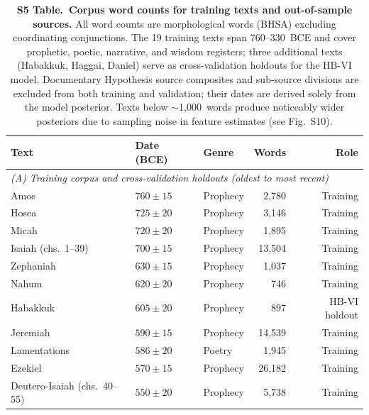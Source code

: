 \documentclass[10pt,letterpaper]{article}
\begin{document}
\begin{table}[!ht]
\caption{\textbf{S5 Table.\ Corpus word counts for training texts and out-of-sample sources.}
All word counts are morphological words (BHSA) excluding coordinating conjunctions.
The 19 training texts span 760--330~BCE and cover prophetic, poetic, narrative, and
wisdom registers; three additional texts (Habakkuk, Haggai, Daniel) serve as
cross-validation holdouts for the HB-VI model.  Documentary Hypothesis source composites
and sub-source divisions are excluded from both training and validation; their dates are
derived solely from the model posterior.  Texts below $\sim$1{,}000~words produce
noticeably wider posteriors due to sampling noise in feature estimates (see Fig.~S10).}
\label{tab:s5_corpus}
\begin{tabular}{lllrr}
\hline
\textbf{Text} & \textbf{Date (BCE)} & \textbf{Genre} & \textbf{Words} & \textbf{Role} \\
\hline
\multicolumn{5}{l}{\textit{(A) Training corpus and cross-validation holdouts (oldest to most recent)}} \\
  Amos                                   & $760\pm15$       & Prophecy     &   2,780 & Training \\
  Hosea                                  & $725\pm20$       & Prophecy     &   3,146 & Training \\
  Micah                                  & $720\pm20$       & Prophecy     &   1,895 & Training \\
  Isaiah (chs.\ 1--39)                   & $700\pm15$       & Prophecy     &  13,504 & Training \\
  Zephaniah                              & $630\pm15$       & Prophecy     &   1,037 & Training \\
  Nahum                                  & $620\pm20$       & Prophecy     &     746 & Training \\
  Habakkuk                               & $605\pm20$       & Prophecy     &     897 & HB-VI holdout \\
  Jeremiah                               & $590\pm15$       & Prophecy     &  14,539 & Training \\
  Lamentations                           & $586\pm20$       & Poetry       &   1,945 & Training \\
  Ezekiel                                & $570\pm15$       & Prophecy     &  26,182 & Training \\
  Deutero-Isaiah (chs.\ 40--55)          & $550\pm20$       & Prophecy     &   5,738 & Training \\

\end{tabular}
\end{table}
\end{document}
